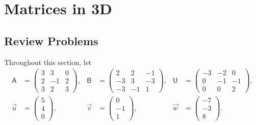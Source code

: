 \section{Matrices in 3D}

\subsection{Review Problems}

Throughout this section, let
\begin{align*}
\mathsf{A} &= \begin{pmatrix} 3 & 3 & 0 \\ 2 & -1 & 2 \\ 3 & 2 & 3 \end{pmatrix}, & \mathsf{B} &= \begin{pmatrix} 2 & 2 & -1 \\ -3 & 3 & -3 \\ -3 & -1 & 1 \end{pmatrix}, & \mathsf{U} &= \begin{pmatrix} -3 & -2 & 0 \\ 0 & -1 & -1 \\ 0 & 0 & 2 \end{pmatrix}, \\
\vec{u} &= \begin{pmatrix} 5 \\ 4 \\ 0 \end{pmatrix}, & \vec{v} &= \begin{pmatrix} 0 \\ -1 \\ 1 \end{pmatrix}, & \vec{w} &= \begin{pmatrix} -7 \\ -3 \\ 8 \end{pmatrix}.
\end{align*}


